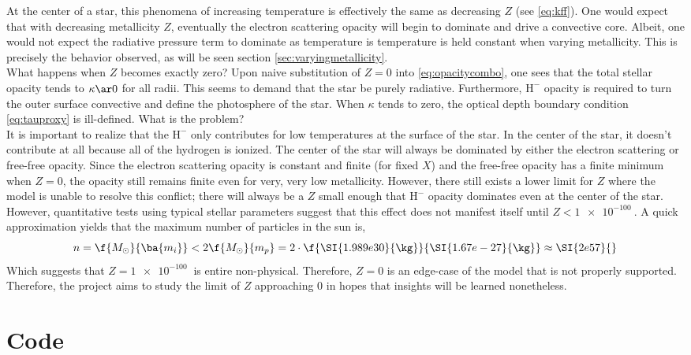 \documentclass[11pt]{article}
\begin{document}
    At the center of a star, this phenomena of increasing temperature is effectively the same as decreasing $Z$ (see \eqref{eq:kff}). One would expect that with decreasing metallicity $Z$, eventually the electron scattering opacity will begin to dominate and drive a convective core. Albeit, one would not expect the radiative pressure term to dominate as temperature is temperature is held constant when varying metallicity. This is precisely the behavior observed, as will be seen section \ref{sec:varyingmetallicity}. \\

    What happens when $Z$ becomes exactly zero? Upon naive substitution of $Z = 0$ into \eqref{eq:opacitycombo}, one sees that the total stellar opacity tends to $\kappa \ar 0$ for all radii. This seems to demand that the star be purely radiative. Furthermore, $\text{H}^-$ opacity is required to turn the outer surface convective and define the photosphere of the star. When $\kappa$ tends to zero, the optical depth boundary condition \eqref{eq:tauproxy} is ill-defined. What is the problem? \\

    It is important to realize that the $\text{H}^-$ only contributes for low temperatures at the surface of the star. In the center of the star, it doesn't contribute at all because all of the hydrogen is ionized. The center of the star will always be dominated by either the electron scattering or free-free opacity. Since the electron scattering opacity is constant and finite (for fixed $X$) and the free-free opacity has a finite minimum when $Z = 0$, the opacity still remains finite even for very, very low metallicity. However, there still exists a lower limit for $Z$ where the model is unable to resolve this conflict; there will always be a $Z$ small enough that $\text{H}^-$ opacity dominates even at the center of the star. However, quantitative tests using typical stellar parameters suggest that this effect does not manifest itself until $Z < \SI{1e-100}{}$. A quick approximation yields that the maximum number of particles in the sun is,
    \[ n = \f{M_\odot}{\ba{m_i}} < 2\f{M_\odot}{m_p} = 2 \cdot \f{\SI{1.989e30}{\kg}}{\SI{1.67e-27}{\kg}} \approx \SI{2e57}{} \]
    Which suggests that $Z = \SI{1e-100}{}$ is entire non-physical. Therefore, $Z=0$ is an edge-case of the model that is not properly supported. Therefore, the project aims to study the limit of $Z$ approaching $0$ in hopes that insights will be learned nonetheless.
    \section{Code}
\end{document}
